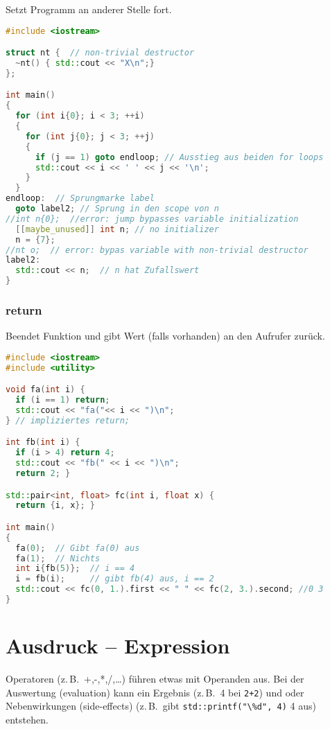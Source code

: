 \documentclass[10pt,twocolumn]{scrartcl}
\begin{document}
Setzt Programm an anderer Stelle fort.

\begin{lstlisting}[language=C++]
#include <iostream>

struct nt {  // non-trivial destructor
  ~nt() { std::cout << "X\n";}
};

int main()
{
  for (int i{0}; i < 3; ++i)
  {
    for (int j{0}; j < 3; ++j)
    {
      if (j == 1) goto endloop; // Ausstieg aus beiden for loops
      std::cout << i << ' ' << j << '\n';
    }
  }
endloop:  // Sprungmarke label
  goto label2; // Sprung in den scope von n
//int n{0};  //error: jump bypasses variable initialization
  [[maybe_unused]] int n; // no initializer
  n = {7};
//nt o;  // error: bypas variable with non-trivial destructor
label2:
  std::cout << n;  // n hat Zufallswert
}
\end{lstlisting}

\subsubsection{return}

Beendet Funktion und gibt Wert (falls vorhanden) an den Aufrufer zurück.

\begin{lstlisting}[language=C++]
#include <iostream>
#include <utility>

void fa(int i) {
  if (i == 1) return;
  std::cout << "fa("<< i << ")\n";
} // impliziertes return;

int fb(int i) {
  if (i > 4) return 4;
  std::cout << "fb(" << i << ")\n";
  return 2; }

std::pair<int, float> fc(int i, float x) {
  return {i, x}; }

int main()
{
  fa(0);  // Gibt fa(0) aus
  fa(1);  // Nichts
  int i{fb(5)};  // i == 4
  i = fb(i);     // gibt fb(4) aus, i == 2
  std::cout << fc(0, 1.).first << " " << fc(2, 3.).second; //0 3
}
\end{lstlisting}

\section{Ausdruck -- Expression}

Operatoren (z.\,B.\ +,-,*,/,\dots) führen etwas mit Operanden aus. Bei der
Auswertung (evaluation) kann ein Ergebnis (z.\,B.\ 4 bei \lstinline|2+2|) und
oder Nebenwirkungen (side-effects) (z.\,B.\ gibt
\lstinline|std::printf("\%d", 4)| 4 aus) entstehen.
\end{document}
